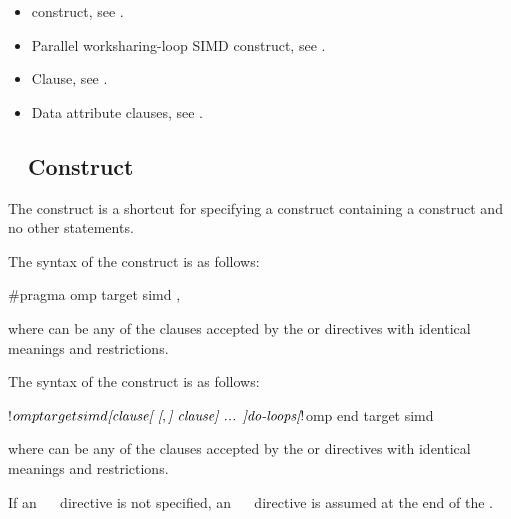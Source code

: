 \crossreferences
\begin{itemize}
\item {} construct, see
.

\item Parallel worksharing-loop SIMD construct, see
.

\item {} Clause, see .

\item Data attribute clauses, see
.

\end{itemize}










\subsection{~ Construct}
\label{subsec:target simd Construct}

\summary
The   construct is a shortcut for specifying a 
construct containing a  construct and no other statements.

\syntax
\begin{ccppspecific}
The syntax of the   construct is as follows:

\begin{ompcPragma}
#pragma omp target simd \plc{[clause[ [},\plc{] clause] ... ] new-line}
\end{ompcPragma}

where  can be any of the clauses accepted by the  or
 directives with identical meanings and restrictions.

\end{ccppspecific}

\begin{fortranspecific}
The syntax of the   construct is as follows:

\begin{ompfPragma}
!$omp target simd \plc{[clause[ [},\plc{] clause] ... ]}
    \plc{do-loops}
\plc{[}!$omp end target simd\plc{]}
\end{ompfPragma}

where  can be any of the clauses accepted by the  or
 directives with identical meanings and restrictions.

If an ~~ directive is not specified, an
~~ directive is assumed at the end of
the .
\end{fortranspecific}

